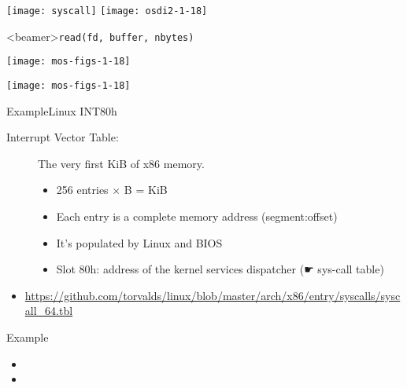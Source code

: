 \begin{center}
  \texttt{[image: syscall]}\quad
  \texttt{[image: osdi2-1-18]}
\end{center}


\begin{frame}<beamer>{\texttt{read(fd, buffer, nbytes)}}
  \begin{minipage}{.3\linewidth}
  \end{minipage}\quad
  \begin{minipage}{.65\linewidth}
    \texttt{[image: mos-figs-1-18]}
  \end{minipage}
\end{frame}

\begin{center}
  \texttt{[image: mos-figs-1-18]}
\end{center}  

\begin{frame}{Example}{Linux INT80h}
  \begin{description}
  \item[Interrupt Vector Table:] The very first \unit[1]{KiB} of x86 memory. 
    \begin{itemize} 
    \item 256 entries $\times$ \unit[4]{B} = \unit[1]{KiB}
    \item Each entry is a complete memory address (segment:offset)
    \item It's populated by Linux and BIOS
    \item Slot 80h: address of the kernel services dispatcher (☛ sys-call table)
    \end{itemize}
  \end{description}
\end{frame}

\begin{itemize}
\item \url{https://github.com/torvalds/linux/blob/master/arch/x86/entry/syscalls/syscall_64.tbl}
\end{itemize}

\begin{frame}{Example}
  \begin{center}
  \end{center}
  \begin{itemize}
  \item[] 
  \item[] 
  \end{itemize}
\end{frame}

